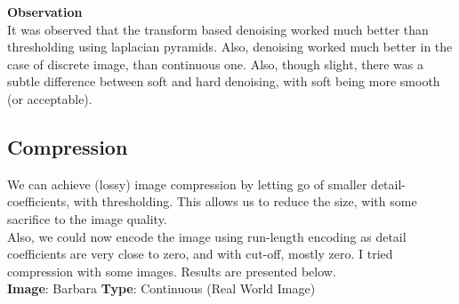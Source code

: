 \documentclass{article}
\begin{document}
    \textbf{Observation}\\
    It was observed that the transform based denoising worked much better than thresholding using laplacian pyramids. Also, denoising worked much better in the case of discrete image, than continuous one. Also, though slight, there was a subtle difference between soft and hard denoising, with soft being more smooth (or acceptable).
    
    
    \pagebreak

    \subsection*{Compression}
    We can achieve (lossy) image compression by letting go of smaller detail-coefficients, with thresholding. This allows us to reduce the size, with some sacrifice to the image quality.
    \\Also, we could now encode the image using run-length encoding as detail coefficients are very close to zero, and with cut-off, mostly zero. I tried compression with some images. Results are presented below.\\[2pt]
    \textbf{Image}: Barbara  \textbf{Type}: Continuous (Real World Image)\\
\end{document}
